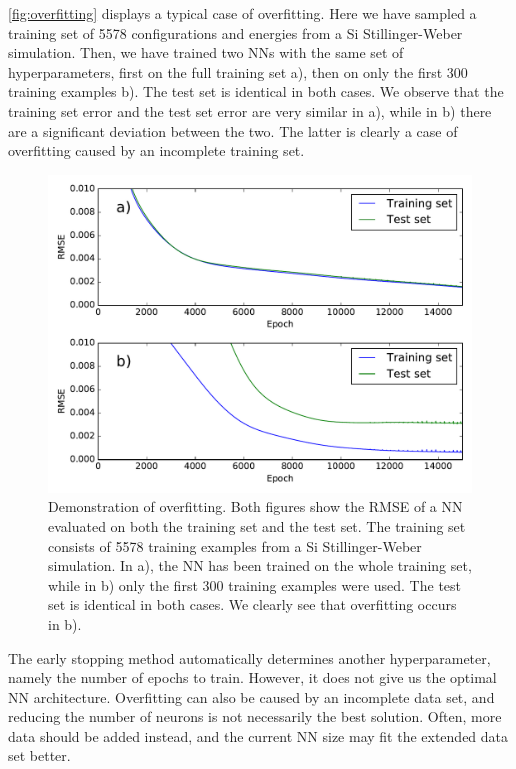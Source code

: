 \documentclass[twoside,english]{uiofysmaster}
\begin{document}
\autoref{fig:overfitting} displays a typical case of overfitting. Here we have sampled a training set 
of 5578 configurations and energies from a Si Stillinger-Weber simulation. Then, we have trained two NNs 
with the same set of hyperparameters, first on the full training set a), then on only the first 300 training examples b).
The test set is identical in both cases. We observe that the training set error and the test set 
error are very similar in a), while in b) there are a significant deviation between the two. The latter is clearly a case 
of overfitting caused by an incomplete training set.  
\begin{figure}
\centering
  \includegraphics[width = 0.8\linewidth]{Figures/Implementation/overfitting.pdf}
  \caption{Demonstration of overfitting. Both figures show the RMSE of a NN evaluated on both the training set and 
	   the test set. The training set consists of 5578 training examples from a Si Stillinger-Weber simulation.
	   In a), the NN has been trained on 
	   the whole training set, while in b) only the first 300 training examples were used. The test set is 
	   identical in both cases. We clearly see that overfitting occurs in b).}
  \label{fig:overfitting}
\end{figure}

The early stopping method automatically determines another hyperparameter, namely the number of epochs to train. 
However, it does not give us the optimal NN architecture. Overfitting can also be caused by an incomplete data set, 
and reducing the number of neurons is not necessarily the best solution. Often, more data should be added instead, 
and the current NN size may fit the extended data set better. 
\end{document}
